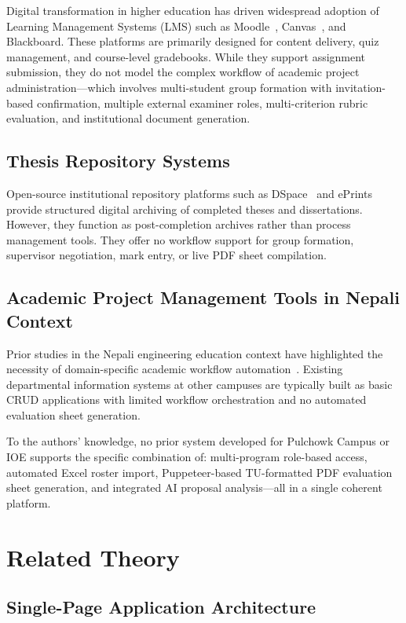 \documentclass[12pt]{report}
\begin{document}
Digital transformation in higher education has driven widespread adoption of Learning Management Systems (LMS) such as Moodle~\citep{moodle2024}, Canvas~\citep{instructure2024}, and Blackboard. These platforms are primarily designed for content delivery, quiz management, and course-level gradebooks. While they support assignment submission, they do not model the complex workflow of academic project administration---which involves multi-student group formation with invitation-based confirmation, multiple external examiner roles, multi-criterion rubric evaluation, and institutional document generation.

\subsection{Thesis Repository Systems}

Open-source institutional repository platforms such as DSpace~\citep{tansley2003dspace} and ePrints provide structured digital archiving of completed theses and dissertations. However, they function as post-completion archives rather than process management tools. They offer no workflow support for group formation, supervisor negotiation, mark entry, or live PDF sheet compilation.

\subsection{Academic Project Management Tools in Nepali Context}

Prior studies in the Nepali engineering education context have highlighted the necessity of domain-specific academic workflow automation~\citep{giri2019transfer}. Existing departmental information systems at other campuses are typically built as basic CRUD applications with limited workflow orchestration and no automated evaluation sheet generation.

To the authors' knowledge, no prior system developed for Pulchowk Campus or IOE supports the specific combination of: multi-program role-based access, automated Excel roster import, Puppeteer-based TU-formatted PDF evaluation sheet generation, and integrated AI proposal analysis---all in a single coherent platform.

\section{Related Theory}

\subsection{Single-Page Application Architecture}
\end{document}
